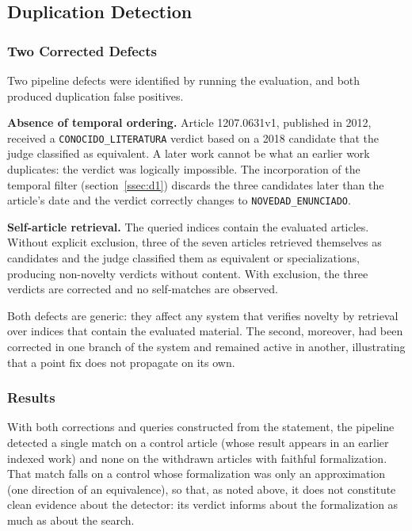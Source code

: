 \subsection{Duplication Detection}

\subsubsection{Two Corrected Defects}

Two pipeline defects were identified by running the evaluation, and both produced duplication false positives.

\textbf{Absence of temporal ordering.} Article 1207.0631v1, published in 2012, received a \texttt{CONOCIDO\_LITERATURA} verdict based on a 2018 candidate that the judge classified as equivalent. A later work cannot be what an earlier work duplicates: the verdict was logically impossible. The incorporation of the temporal filter (section~\ref{ssec:d1}) discards the three candidates later than the article's date and the verdict correctly changes to \texttt{NOVEDAD\_ENUNCIADO}.

\textbf{Self-article retrieval.} The queried indices contain the evaluated articles. Without explicit exclusion, three of the seven articles retrieved themselves as candidates and the judge classified them as equivalent or specializations, producing non-novelty verdicts without content. With exclusion, the three verdicts are corrected and no self-matches are observed.

Both defects are generic: they affect any system that verifies novelty by retrieval over indices that contain the evaluated material. The second, moreover, had been corrected in one branch of the system and remained active in another, illustrating that a point fix does not propagate on its own.

\subsubsection{Results}

With both corrections and queries constructed from the statement, the pipeline detected a single match on a control article (whose result appears in an earlier indexed work) and none on the withdrawn articles with faithful formalization. That match falls on a control whose formalization was only an approximation (one direction of an equivalence), so that, as noted above, it does not constitute clean evidence about the detector: its verdict informs about the formalization as much as about the search.

